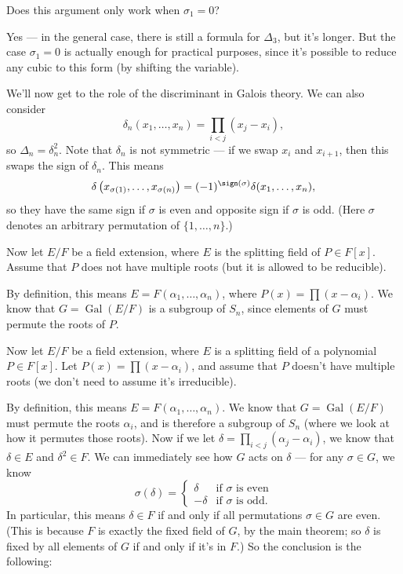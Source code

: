 \begin{question}
    Does this argument only work when $\sigma_1 = 0$?
\end{question}

\begin{ans}
    Yes --- in the general case, there is still a formula for $\Delta_3$, but it's longer. But the case $\sigma_1 = 0$ is actually enough for practical purposes, since it's possible to reduce any cubic to this form (by shifting the variable). 
\end{ans}

We'll now get to the role of the discriminant in Galois theory. We can also consider \[\delta_n(x_1, \ldots, x_n) = \prod_{i < j} (x_j - x_i),\] so $\Delta_n = \delta_n^2$. Note that $\delta_n$ is not symmetric --- if we swap $x_i$ and $x_{i + 1}$, then this swaps the sign of $\delta_n$. This means \[\delta\left(x_{\sigma(1)}, \ldots, x_{\sigma(n)}\right) = (-1)^{\sign(\sigma)}\delta(x_1, \ldots, x_n),\] so they have the same sign if $\sigma$ is even and opposite sign if $\sigma$ is odd. (Here $\sigma$ denotes an arbitrary permutation of $\{1, \ldots, n\}$.)

Now let $E/F$ be a field extension, where $E$ is the splitting field of $P \in F[x]$. Assume that $P$ does not have multiple roots (but it is allowed to be reducible). 

By definition, this means $E = F(\alpha_1, \ldots, \alpha_n)$, where $P(x) = \prod (x - \alpha_i)$. We know that $G = \operatorname{Gal}(E/F)$ is a subgroup of $S_n$, since elements of $G$ must permute the roots of $P$. 

Now let $E/F$ be a field extension, where $E$ is a splitting field of a polynomial $P \in F[x]$. Let $P(x) = \prod (x - \alpha_i)$, and assume that $P$ doesn't have multiple roots (we don't need to assume it's irreducible). 

By definition, this means $E = F(\alpha_1, \ldots, \alpha_n)$. We know that $G = \operatorname{Gal}(E/F)$ must permute the roots $\alpha_i$, and is therefore a subgroup of $S_n$ (where we look at how it permutes those roots). Now if we let $\delta = \prod_{i < j} (\alpha_j - \alpha_i)$, we know that $\delta \in E$ and $\delta^2 \in F$. We can immediately see how $G$ acts on $\delta$ --- for any $\sigma \in G$, we know \[\sigma(\delta) = \begin{cases} \delta & \text{if $\sigma$ is even} \\ -\delta & \text{if $\sigma$ is odd}.\end{cases}\] In particular, this means $\delta \in F$ if and only if  all permutations $\sigma \in G$ are even. (This is because $F$ is exactly the fixed field of $G$, by the main theorem; so $\delta$ is fixed by all elements of $G$ if and only if  it's in $F$.) So the conclusion is the following:

